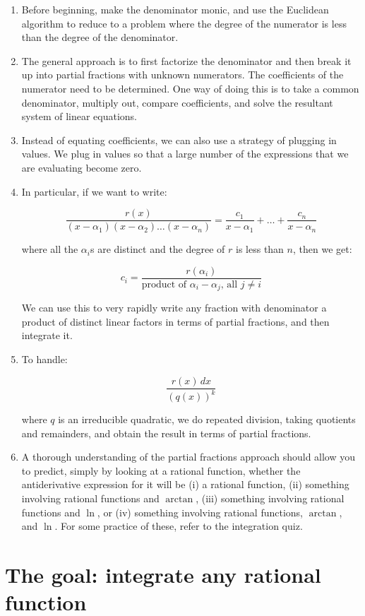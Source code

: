\documentclass[10pt]{amsart}
\begin{document}
\begin{enumerate}
\item Before beginning, make the denominator monic, and use the
  Euclidean algorithm to reduce to a problem where the degree of the
  numerator is less than the degree of the denominator.
\item The general approach is to first factorize the denominator and
  then break it up into partial fractions with unknown numerators. The
  coefficients of the numerator need to be determined. One way of
  doing this is to take a common denominator, multiply out, compare
  coefficients, and solve the resultant system of linear equations.
\item Instead of equating coefficients, we can also use a strategy of
  plugging in values. We plug in values so that a large number of the
  expressions that we are evaluating become zero.
\item In particular, if we want to write:

  $$\frac{r(x)}{(x - \alpha_1)(x - \alpha_2) \dots (x - \alpha_n)} = \frac{c_1}{x - \alpha_1} + \dots + \frac{c_n}{x - \alpha_n}$$

  where all the $\alpha_i$s are distinct and the degree of $r$ is less
  than $n$, then we get:

  $$c_i = \frac{r(\alpha_i)}{\text{product of $\alpha_i - \alpha_j$, all $j \ne i$}}$$

  We can use this to very rapidly write any fraction with denominator
  a product of distinct linear factors in terms of partial fractions,
  and then integrate it.
\item To handle:

  $$\frac{r(x) \, dx}{(q(x))^k}$$

  where $q$ is an irreducible quadratic, we do repeated division,
  taking quotients and remainders, and obtain the result in terms of
  partial fractions.
\item A thorough understanding of the partial fractions approach
  should allow you to predict, simply by looking at a rational
  function, whether the antiderivative expression for it will be (i) a
  rational function, (ii) something involving rational functions and
  $\arctan$, (iii) something involving rational functions and $\ln$,
  or (iv) something involving rational functions, $\arctan$, and
  $\ln$. For some practice of these, refer to the integration quiz.
\end{enumerate}

\section{The goal: integrate any rational function}
\end{document}

